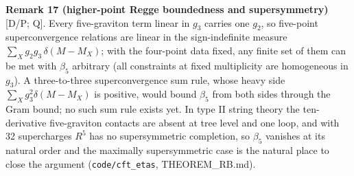 \textbf{Remark 17 (higher-point Regge boundedness and supersymmetry)} [D/P; Q]. Every five-graviton term linear in $g_3$ carries one $g_2$, so five-point
superconvergence relations are linear in the sign-indefinite measure $\sum_Xg_2g_3\,\delta(M-M_X)$; with the four-point data fixed, any finite set of them
can be met with $\beta_5$ arbitrary (all constraints at fixed multiplicity are homogeneous in $g_3$). A three-to-three superconvergence sum rule, whose
heavy side $\sum_Xg_3^2\delta(M-M_X)$ is positive, would bound $\beta_5$ from both sides through the Gram bound; no such sum rule exists yet. In type II
string theory the ten-derivative five-graviton contacts are absent at tree level and one loop, and with 32 supercharges $R^5$ has no supersymmetric
completion, so $\beta_5$ vanishes at its natural order and the maximally supersymmetric case is the natural place to close the argument
(\texttt{code/cft\_etas}, THEOREM\_RB.md).

